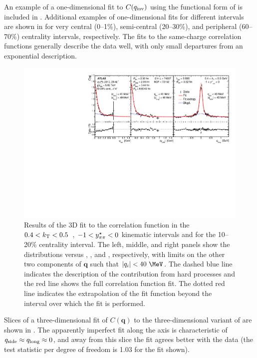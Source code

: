 An example of a one-dimensional fit to $C(q_{\mathrm{inv}})$ using the functional form of  is included in .
Additional examples of one-dimensional fits for different \kt intervals are shown in  for very central (0--1\%), semi-central (20--30\%), and peripheral (60--70\%) centrality intervals, respectively.
The fits to the same-charge correlation functions generally describe the data well, with only small departures from an exponential description.


\begin{figure}[h]
\centering
\includegraphics[width=0.97\linewidth]{Cqosl_slices_cent3_e3_kt3_ys1.pdf}
\caption{Results of the 3D fit to the correlation function in the $0.4 < k_\mathrm{T} < 0.5$~\GeV, $-1 < y^{\star}_{\pi\pi} < 0$ kinematic intervals and for the 10--20\% centrality interval.
The left, middle, and right panels show the distributions versus \qout, \qside, and \qlong, respectively, with limits on the other two components of $\mathbf{q}$ such that $|q_i| < 40~\MeV$.
The dashed blue line indicates the description of the contribution from hard processes and the red line shows the full correlation function fit.
The dotted red line indicates the extrapolation of the fit function beyond the interval over which the fit is performed.
}
\label{fig:cqosl_slices}
\end{figure}


Slices of a three-dimensional fit of $C(\mathbf{q})$ to the three-dimensional variant of  are shown in .
The apparently imperfect fit along the \qout axis is characteristic of $q_{\mathrm{side}} \approx q_{\mathrm{long}} \approx 0$, and away from this slice the  fit agrees better with the data (the test statistic per degree of freedom is 1.03 for the fit shown). 



